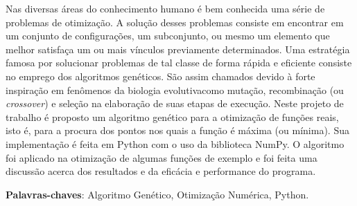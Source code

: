 Nas diversas áreas do conhecimento humano é bem conhecida uma série de problemas de otimização. 
A solução desses problemas consiste em encontrar em um conjunto de configurações, um subconjunto,
ou mesmo um elemento que melhor satisfaça um ou mais vínculos previamente determinados. Uma
estratégia famosa por solucionar problemas de tal classe de forma rápida e eficiente consiste no
emprego dos algoritmos genéticos. São assim chamados devido à forte inspiração em fenômenos
da biologia evolutiva\trav como mutação, recombinação (ou \textit{crossover}) e seleção\trav
na elaboração de suas etapas de execução. Neste projeto de trabalho é proposto um algoritmo genético para
a otimização de funções reais, isto é, para a procura dos pontos nos quais a função é máxima
(ou mínima). Sua implementação é feita em Python com o uso da biblioteca NumPy. 
O algoritmo foi aplicado na otimização de algumas funções de exemplo e foi feita uma discussão acerca dos
resultados e da eficácia e performance do programa. 

\vspace{\onelineskip}\noindent
\textbf{Palavras-chaves}: Algoritmo Genético, Otimização Numérica, Python.